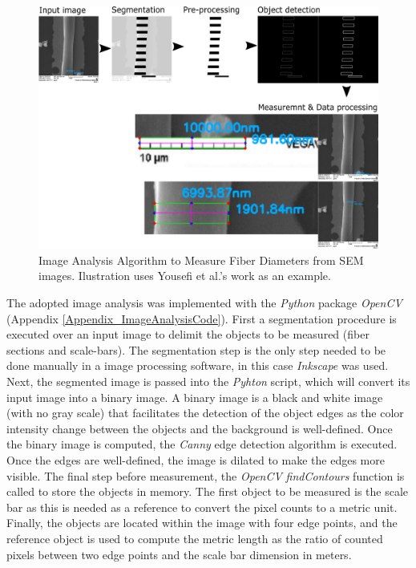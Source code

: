 \begin{figure}[!th]
\centering
\includegraphics[scale=0.50]{./Figures/imageAnalysisAlgorithm.png}
\decoRule
\caption[Image Analysis Algorithm to Measure Fiber Diameters from SEM images]{Image Analysis Algorithm to Measure Fiber Diameters from SEM images. Ilustration uses Yousefi et al.'s work as an example. \cite{Yousefi2019}}
\label{fig:imageAnalysisAlgorithm}
\end{figure}

The adopted image analysis was implemented with the \emph{Python} package \emph{OpenCV} (Appendix \ref{Appendix_ImageAnalysisCode}). First a segmentation procedure is executed over an input image to delimit the objects to be measured (fiber sections and scale-bars). The segmentation step is the only step needed to be done manually in a image processing software, in this case \emph{Inkscape} was used. Next, the segmented image is passed into the \emph{Pyhton} script, which will convert its input image into a binary image. A binary image is a black and white image (with no gray scale) that facilitates the detection of the object edges as the color intensity change between the objects and the background is well-defined. Once the binary image is computed, the \emph{Canny} edge detection algorithm is executed. Once the edges are well-defined, the image is dilated to make the edges more visible. The final step before measurement, the \emph{OpenCV} \emph{findContours} function is called to store the objects in memory. The first object to be measured is the scale bar as this is needed as a reference to convert the pixel counts to a metric unit. Finally, the objects are located within the image with four edge points, and the reference object is used to compute the metric length as the ratio of counted pixels between two edge points and the scale bar dimension in meters.

